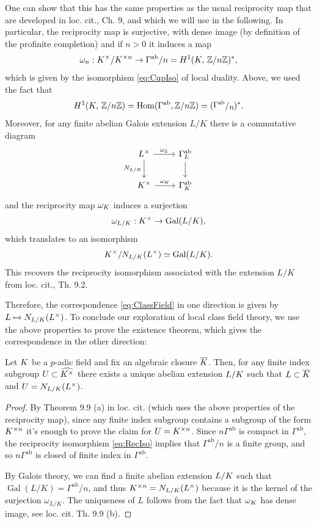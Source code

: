 \documentclass[a4paper, oneside]{memoir}
\begin{document}
\begin{remark}
	One can show that this has the same properties as the usual reciprocity map that are developed in loc. cit., Ch. 9, and which we will use in the following. In particular, the reciprocity map is surjective, with dense image (by definition of the profinite completion) and if $n>0$ it induces a map
	\begin{equation}\label{eq:RecIso}
		\omega_n:K^\times / K^{\times n} \to \Gamma^{\text{ab}}/n = H^{1}( K, \, \mathbb{Z}/n\mathbb{Z} )^*,
	\end{equation}
	which is given by the isomorphism \eqref{eq:CupIso} of local duality. Above, we used the fact that \[\H{1}{\K}{\Zn}=
		\Hom(\Gamma^{\text{ab}},\Zn)=(\sfrac{\Gamma^{\text{ab}}}{n})^*.\]
	Moreover, for any finite abelian Galois extension $L / K$ there is a commutative diagram
	\[
		\begin{tikzcd}\label{eq:NormDiag}
			L^\times \ar[r, "\omega_L"] \ar[d, swap, "N_{L/\K}"] & \Gamma_L^{\text{ab}} \ar[d] \\
			K^\times \ar[r, "\omega_K"]       & \Gamma_K^{\text{ab}}
		\end{tikzcd}
	\]
	and the reciprocity map $\omega_K$ induces a surjection
	\[
		\omega_{L/K}:K^\times \to \operatorname{Gal}(L/K),
	\]
	which translates to an isomorphism \[K^\times / N_{L/K}(L^\times) \simeq \operatorname{Gal}(L/K).\] This recovers the reciprocity isomorphism associated with the extension $L/K$ from loc. cit., Th. 9.2.
\end{remark}

Therefore, the correspondence \eqref{eq:ClassField} in one direction is given by $L \mapsto N_{L/K}(L^\times)$. To conclude our exploration of local class field theory, we use the above properties to prove the existence theorem, which gives the correspondence in the other direction:

\begin{theorem}
	Let $K$ be a $p$-adic field and fix an algebraic closure $\overline{K}$. Then, for any finite index subgroup $U\subset\widehat{K^\times}$
	there exists a unique abelian extension $L / K$ such that $L \subset \overline{K}$ and $U=N_{L/K}(L^\times)$.
\end{theorem}

\begin{proof}
	By Theorem 9.9 (a) in loc. cit. (which uses the above properties of the reciprocity map), since any finite index subgroup contains a subgroup of the form $K^{\times n}$ it's enough to prove the claim for $U=K^{\times n}$. Since $n\Gamma^{\text{ab}}$ is compact in $\Gamma^{\text{ab}}$, the reciprocity isomorphism \eqref{eq:RecIso} implies that $\Gamma^{\text{ab}}/n$ is a finite group, and so $n\Gamma^{\text{ab}}$ is closed of finite index in $\Gamma^{\text{ab}}$.

	By Galois theory, we can find a finite abelian extension $L/K$ such that $\operatorname{Gal}{(L/K)}=\Gamma^{\text{ab}}/n$, and thus $K^{\times n}=N_{L/K}(L^\times)$ because it is the kernel of the surjection $\omega_{L/K}$. The uniqueness of $L$ follows from the fact that $\omega_K$ has dense image, see loc. cit. Th. 9.9 (b).
\end{proof}

\nocite{*}
\printbibliography
\end{document}
